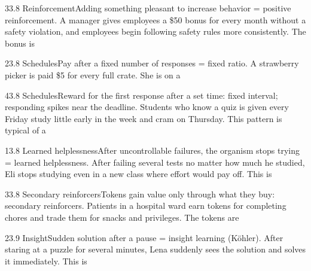 \documentclass[11pt]{article}
\begin{document}
\begin{q}{3}{3.8 Reinforcement}{Adding something pleasant to increase behavior = positive reinforcement.}
A manager gives employees a \$50 bonus for every month without a safety violation, and employees begin following safety rules more consistently. The bonus is
\end{q}

\begin{q}{2}{3.8 Schedules}{Pay after a fixed number of responses = fixed ratio.}
A strawberry picker is paid \$5 for every full crate. She is on a
\end{q}

\begin{q}{4}{3.8 Schedules}{Reward for the first response after a set time: fixed interval; responding spikes near the deadline.}
Students who know a quiz is given every Friday study little early in the week and cram on Thursday. This pattern is typical of a
\end{q}

\begin{q}{1}{3.8 Learned helplessness}{After uncontrollable failures, the organism stops trying = learned helplessness.}
After failing several tests no matter how much he studied, Eli stops studying even in a new class where effort would pay off. This is
\end{q}

\begin{q}{3}{3.8 Secondary reinforcers}{Tokens gain value only through what they buy: secondary reinforcers.}
Patients in a hospital ward earn tokens for completing chores and trade them for snacks and privileges. The tokens are
\end{q}

\begin{q}{2}{3.9 Insight}{Sudden solution after a pause = insight learning (Köhler).}
After staring at a puzzle for several minutes, Lena suddenly sees the solution and solves it immediately. This is
\end{q}
\end{document}

